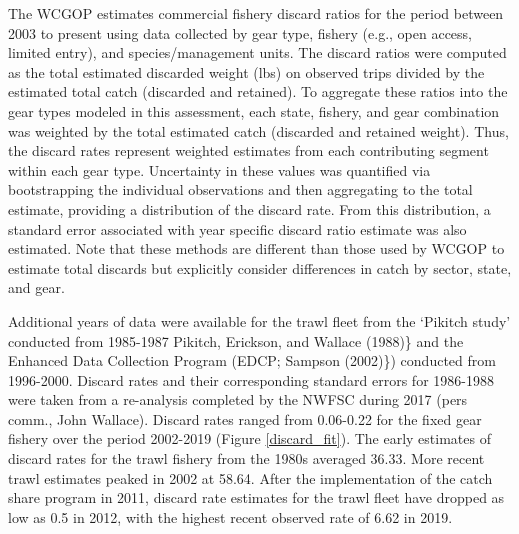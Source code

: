 \documentclass[11pt,
  english,
  a4paper,
]{article}
\begin{document}
The WCGOP estimates commercial fishery discard ratios for the period between 2003 to present using data collected by gear type, fishery (e.g., open access, limited entry), and species/management units. The discard ratios were computed as the total estimated discarded weight (lbs) on observed trips divided by the estimated total catch (discarded and retained). To aggregate these ratios into the gear types modeled in this assessment, each state, fishery, and gear combination was weighted by the total estimated catch (discarded and retained weight). Thus, the discard rates represent weighted estimates from each contributing segment within each gear type. Uncertainty in these values was quantified via bootstrapping the individual observations and then aggregating to the total estimate, providing a distribution of the discard rate. From this distribution, a standard error associated with year specific discard ratio estimate was also estimated. Note that these methods are different than those used by WCGOP to estimate total discards but explicitly consider differences in catch by sector, state, and gear.

\leavevmode\tagmcend\tagstructend\par


Additional years of data were available for the trawl fleet from the `Pikitch study' conducted from 1985-1987 {Pikitch, Erickson, and Wallace (1988)\leavevmode\tagmcend\tagstructend}\} and the Enhanced Data Collection Program (EDCP; {Sampson (2002)\leavevmode\tagmcend\tagstructend}\}) conducted from 1996-2000. Discard rates and their corresponding standard errors for 1986-1988 were taken from a re-analysis completed by the NWFSC during 2017 (pers comm., John Wallace). Discard rates ranged from 0.06-0.22 for the fixed gear fishery over the period 2002-2019 (Figure \ref{discard_fit}). The early estimates of discard rates for the trawl fishery from the 1980s averaged 36.33. More recent trawl estimates peaked in 2002 at 58.64. After the implementation of the catch share program in 2011, discard rate estimates for the trawl fleet have dropped as low as 0.5 in 2012, with the highest recent observed rate of 6.62 in 2019.

\leavevmode\tagmcend\tagstructend\par

\end{document}
